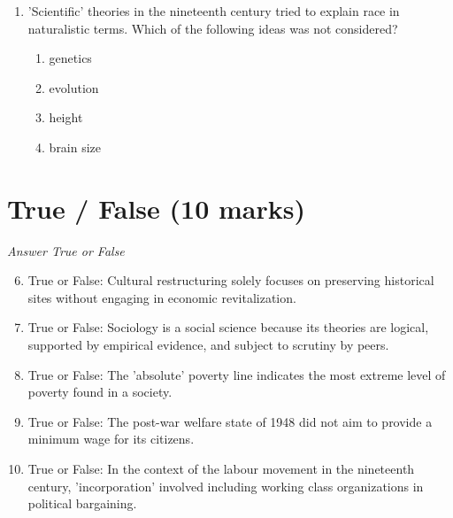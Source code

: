 \documentclass[12pt]{article}
\begin{document}
\begin{enumerate}[label=\arabic*.]
\begin{enumerate}[label=(\alph*)]
    \item the findings are amenable to statistical analysis
    \item it is conducted over a period of several years
    \item it uncovers rich, detailed accounts from an insider's perspective
    \item it compares findings from a number of different cases
\end{enumerate}
\item 'Scientific' theories in the nineteenth century tried to explain race in naturalistic terms. Which of the following ideas was not considered?
\begin{enumerate}[label=(\alph*)]
    \item genetics
    \item evolution
    \item height
    \item brain size
\end{enumerate}
\end{enumerate}

\section*{True / False (10 marks)}
\textit{Answer True or False}
\begin{enumerate}[label=\arabic*.]
\setcounter{enumi}{5}
\item True or False: Cultural restructuring solely focuses on preserving historical sites without engaging in economic revitalization.
\item True or False: Sociology is a social science because its theories are logical, supported by empirical evidence, and subject to scrutiny by peers.
\item True or False: The 'absolute' poverty line indicates the most extreme level of poverty found in a society.
\item True or False: The post-war welfare state of 1948 did not aim to provide a minimum wage for its citizens.
\item True or False: In the context of the labour movement in the nineteenth century, 'incorporation' involved including working class organizations in political bargaining.
\end{enumerate}
\end{document}
